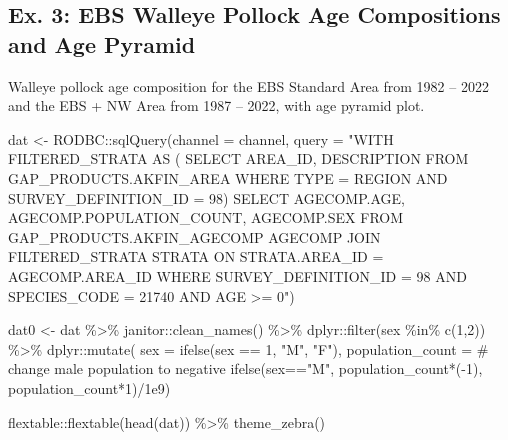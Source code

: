 \documentclass[
  letterpaper,
  oneside,
  open=any]{scrbook}
\newenvironment{Shaded}{\begin{snugshade}}{\end{snugshade}}
\newcommand{\AttributeTok}[1]{\textcolor[rgb]{0.40,0.45,0.13}{#1}}
\newcommand{\CommentTok}[1]{\textcolor[rgb]{0.37,0.37,0.37}{#1}}
\newcommand{\DecValTok}[1]{\textcolor[rgb]{0.68,0.00,0.00}{#1}}
\newcommand{\FloatTok}[1]{\textcolor[rgb]{0.68,0.00,0.00}{#1}}
\newcommand{\FunctionTok}[1]{\textcolor[rgb]{0.28,0.35,0.67}{#1}}
\newcommand{\NormalTok}[1]{\textcolor[rgb]{0.00,0.23,0.31}{#1}}
\newcommand{\OtherTok}[1]{\textcolor[rgb]{0.00,0.23,0.31}{#1}}
\newcommand{\SpecialCharTok}[1]{\textcolor[rgb]{0.37,0.37,0.37}{#1}}
\newcommand{\StringTok}[1]{\textcolor[rgb]{0.13,0.47,0.30}{#1}}
\begin{document}
\hypertarget{ex.-3-ebs-walleye-pollock-age-compositions-and-age-pyramid}{%
\subsection{Ex. 3: EBS Walleye Pollock Age Compositions and Age
Pyramid}\label{ex.-3-ebs-walleye-pollock-age-compositions-and-age-pyramid}}

Walleye pollock age composition for the EBS Standard Area from 1982 --
2022 and the EBS + NW Area from 1987 -- 2022, with age pyramid plot.

\begin{Shaded}
\begin{Highlighting}[]
\NormalTok{dat }\OtherTok{\textless{}{-}}\NormalTok{ RODBC}\SpecialCharTok{::}\FunctionTok{sqlQuery}\NormalTok{(}\AttributeTok{channel =}\NormalTok{ channel, }
                       \AttributeTok{query =} 
\StringTok{"WITH FILTERED\_STRATA AS (}
\StringTok{SELECT }
\StringTok{AREA\_ID, }
\StringTok{DESCRIPTION }
\StringTok{FROM GAP\_PRODUCTS.AKFIN\_AREA}
\StringTok{WHERE TYPE = \textquotesingle{}REGION\textquotesingle{} AND }
\StringTok{SURVEY\_DEFINITION\_ID = 98)}
\StringTok{SELECT }
\StringTok{AGECOMP.AGE, }
\StringTok{AGECOMP.POPULATION\_COUNT, }
\StringTok{AGECOMP.SEX}
\StringTok{FROM GAP\_PRODUCTS.AKFIN\_AGECOMP AGECOMP}
\StringTok{JOIN FILTERED\_STRATA STRATA }
\StringTok{ON STRATA.AREA\_ID = AGECOMP.AREA\_ID}
\StringTok{WHERE SURVEY\_DEFINITION\_ID = 98 }
\StringTok{AND SPECIES\_CODE = 21740}
\StringTok{AND AGE \textgreater{}= 0"}\NormalTok{)}
\end{Highlighting}
\end{Shaded}

\begin{Shaded}
\begin{Highlighting}[]
\NormalTok{dat0 }\OtherTok{\textless{}{-}}\NormalTok{ dat }\SpecialCharTok{\%\textgreater{}\%} 
\NormalTok{  janitor}\SpecialCharTok{::}\FunctionTok{clean\_names}\NormalTok{() }\SpecialCharTok{\%\textgreater{}\%} 
\NormalTok{  dplyr}\SpecialCharTok{::}\FunctionTok{filter}\NormalTok{(sex }\SpecialCharTok{\%in\%} \FunctionTok{c}\NormalTok{(}\DecValTok{1}\NormalTok{,}\DecValTok{2}\NormalTok{)) }\SpecialCharTok{\%\textgreater{}\%}
\NormalTok{  dplyr}\SpecialCharTok{::}\FunctionTok{mutate}\NormalTok{(}
    \AttributeTok{sex =} \FunctionTok{ifelse}\NormalTok{(sex }\SpecialCharTok{==} \DecValTok{1}\NormalTok{, }\StringTok{"M"}\NormalTok{, }\StringTok{"F"}\NormalTok{),}
    \AttributeTok{population\_count =} \CommentTok{\# change male population to negative}
      \FunctionTok{ifelse}\NormalTok{(sex}\SpecialCharTok{==}\StringTok{"M"}\NormalTok{, population\_count}\SpecialCharTok{*}\NormalTok{(}\SpecialCharTok{{-}}\DecValTok{1}\NormalTok{), population\_count}\SpecialCharTok{*}\DecValTok{1}\NormalTok{)}\SpecialCharTok{/}\FloatTok{1e9}\NormalTok{) }

\NormalTok{flextable}\SpecialCharTok{::}\FunctionTok{flextable}\NormalTok{(}\FunctionTok{head}\NormalTok{(dat)) }\SpecialCharTok{\%\textgreater{}\%} \FunctionTok{theme\_zebra}\NormalTok{()}
\end{Highlighting}
\end{Shaded}
\end{document}

